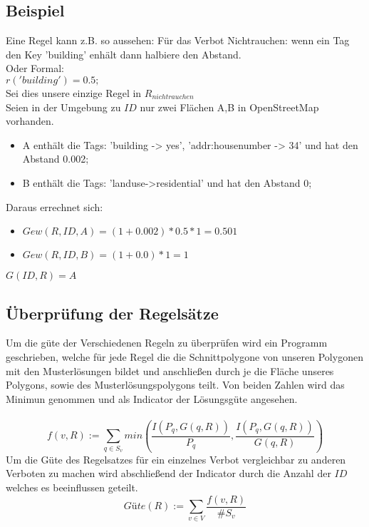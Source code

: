 \subsection{Beispiel}
Eine Regel kann z.B. so aussehen:
Für das Verbot Nichtrauchen: wenn ein Tag den Key 'building' enhält dann halbiere den Abstand. \\
Oder Formal: \\
$r('building') = 0.5;$\\
Sei dies unsere einzige Regel in $R_{nichtrauchen}$
\\
\newline
Seien in der Umgebung zu $ID$ nur zwei Flächen A,B in OpenStreetMap vorhanden.
\begin{itemize}
\item A enthält die Tags: 'building -> yes', 'addr:housenumber -> 34' und hat den Abstand 0.002;
\item B enthält die Tags: 'landuse->residential' und hat den Abstand 0;
\end{itemize}
Daraus errechnet sich:
\begin{itemize}
\item $Gew(R,ID,A) = (1+0.002) * 0.5 * 1 = 0.501$
\item $Gew(R,ID,B) = (1+0.0) * 1 = 1$
\end{itemize}

$G(ID,R) = A$

\subsection{Überprüfung der Regelsätze}
Um die güte der Verschiedenen Regeln zu überprüfen wird ein Programm geschrieben, welche für jede Regel die die Schnittpolygone von unseren Polygonen mit
den Musterlösungen bildet und anschließen durch je die Fläche unseres Polygons, sowie des Musterlösungspolygons teilt.
Von beiden Zahlen wird das Minimun genommen und als Indicator der Lösungsgüte angesehen.\\
\newline
\\
\begin{equation}
f(v,R) := \sum_{q\in S_v} min(\frac{I(P_q,G(q,R))}{P_q},\frac{I(P_q,G(q,R))}{G(q,R)})
\end{equation}
Um die Güte des Regelsatzes für ein einzelnes Verbot vergleichbar zu anderen Verboten zu machen wird abschließend der Indicator durch
die Anzahl der $ID$ welches es beeinflussen geteilt.\\
\begin{equation}
Güte(R) := \sum_{v \in V} \frac{ f(v,R)}{\#S_v}
\end{equation}

